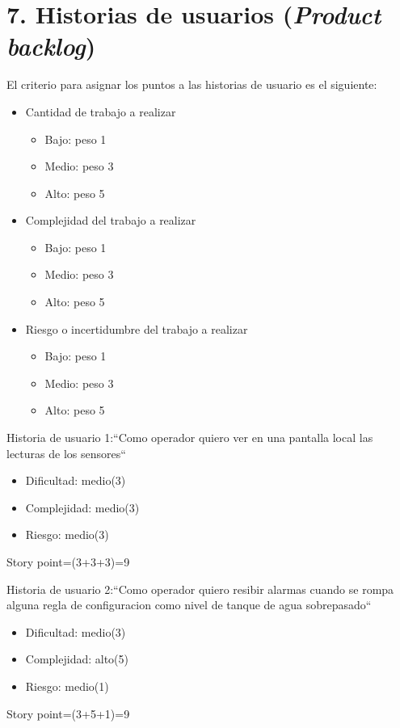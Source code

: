 \documentclass[
11pt, %
codirector, %
]{charter}
\begin{document}
\begin{enumerate}
\end{enumerate}

\section{7. Historias de usuarios (\textit{Product backlog})}
\label{sec:backlog}

El criterio para asignar los puntos a las historias de usuario es el siguiente:
\begin{itemize}
	\item Cantidad de trabajo a realizar 
	\begin{itemize}
		\item Bajo: peso 1
		\item Medio: peso 3
		\item Alto: peso 5 
	\end{itemize}
	\item Complejidad del trabajo a realizar
	\begin{itemize}
		\item Bajo: peso 1
		\item Medio: peso 3
		\item Alto: peso 5  
	\end{itemize}
	\item Riesgo o incertidumbre del trabajo a realizar
	\begin{itemize}
		\item Bajo: peso 1
		\item Medio: peso 3
		\item Alto: peso 5  
	\end{itemize}
\end{itemize}

Historia de usuario 1:``Como operador quiero ver en una pantalla local las lecturas de los sensores``
\begin{itemize}
	\item Dificultad: medio(3) 
	\item Complejidad: medio(3)
	\item Riesgo: medio(3)  
\end{itemize}
Story point=(3+3+3)=9

Historia de usuario 2:``Como operador quiero resibir alarmas cuando se rompa alguna regla de configuracion como nivel de tanque de agua sobrepasado``
\begin{itemize}
	\item Dificultad: medio(3) 
	\item Complejidad: alto(5)
	\item Riesgo: medio(1)
\end{itemize}
Story point=(3+5+1)=9
\end{document}
